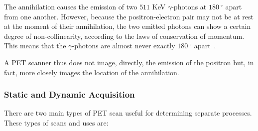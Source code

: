                The annihilation causes the emission of two $511$ \gls{KeV} $\gamma$-photons at $\SI{180}{^{\circ}}$ apart from one another. However, because the positron-electron pair may not be at rest at the moment of their annihilation, the two emitted photons can show a certain degree of non-collinearity, according to the laws of conservation of momentum. This means that the $\gamma$-photons are almost never exactly $\SI{180}{^{\circ}}$ apart~. %
                
                A \gls{PET} scanner thus does not image, directly, the emission of the positron but, in fact, more closely images the location of the annihilation. %
            
            \subsubsection{Static and Dynamic Acquisition} \label{sec:static_and_dynamic_acquisition}
                There are two main types of \gls{PET} scan useful for determining separate processes. These types of scans and uses are:
                

